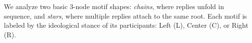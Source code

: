 \documentclass[letterpaper]{article} %
\begin{document}
We analyze two basic 3-node motif shapes: \textit{chains}, where replies unfold in sequence, and \textit{stars}, where multiple replies attach to the same root. Each motif is labeled by the ideological stance of its participants: Left (L), Center (C), or Right (R).





\end{document}
